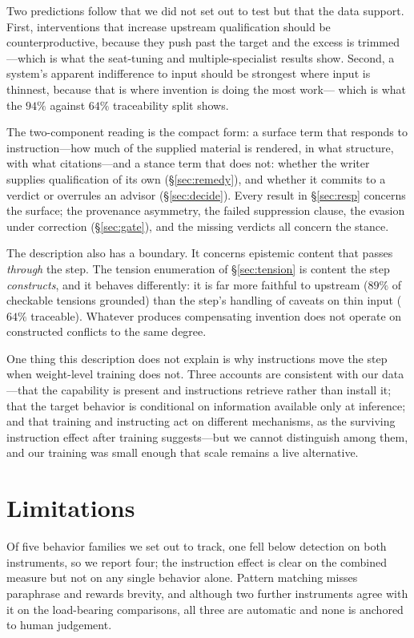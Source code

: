 \documentclass[11pt]{article}
\begin{document}
Two predictions follow that we did not set out to test but that the data
support. First, interventions that increase upstream qualification should be
counterproductive, because they push past the target and the excess is
trimmed---which is what the seat-tuning and multiple-specialist results show.
Second, a system's apparent indifference to input should be strongest where
input is thinnest, because that is where invention is doing the most work---
which is what the $94\%$ against $64\%$ traceability split shows.

The two-component reading is the compact form: a surface term that responds
to instruction---how much of the supplied material is rendered, in what
structure, with what citations---and a stance term that does not: whether
the writer supplies qualification of its own (\S\ref{sec:remedy}), and
whether it commits to a verdict or overrules an advisor
(\S\ref{sec:decide}). Every result in \S\ref{sec:resp} concerns the
surface; the provenance asymmetry, the failed suppression clause, the
evasion under correction (\S\ref{sec:gate}), and the missing verdicts all
concern the stance.

The description also has a boundary. It concerns epistemic content that
passes \emph{through} the step. The tension enumeration of
\S\ref{sec:tension} is content the step \emph{constructs}, and it behaves
differently: it is far more faithful to upstream ($89\%$ of checkable
tensions grounded) than the step's handling of caveats on thin input ($64\%$
traceable). Whatever produces compensating invention does not operate on
constructed conflicts to the same degree.

One thing this description does not explain is why instructions move the step
when weight-level training does not. Three accounts are consistent with our
data---that the capability is present and instructions retrieve rather than
install it; that the target behavior is conditional on information available
only at inference; and that training and instructing act on different
mechanisms, as the surviving instruction effect after training suggests---but
we cannot distinguish among them, and our training was small enough that scale
remains a live alternative.

\section{Limitations}
\label{sec:limits}
Of five behavior families we set out to track, one fell below detection on
both instruments, so we report four; the instruction effect is clear on the
combined measure but not on any single behavior alone. Pattern matching misses
paraphrase and rewards brevity, and although two further instruments agree
with it on the load-bearing comparisons, all three are automatic and none is
anchored to human judgement.
\end{document}
